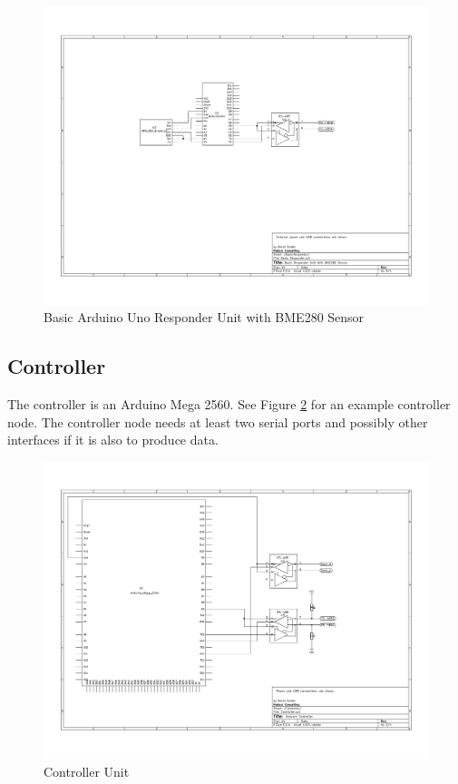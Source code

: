 \documentclass[10pt]{article}
\begin{document}
\begin{figure}
  \centering
  \includegraphics[width=\textwidth]{ResponderUnit.pdf}
  \caption{Basic Arduino Uno Responder Unit with BME280 Sensor}
  \label{fig:basic}
\end{figure}

\subsection{Controller}
The controller is an Arduino Mega 2560.  See Figure \ref{fig:controller} for an example controller node.  The controller node needs at least two serial ports and possibly other interfaces if it is also to produce data.

\begin{figure}
  \centering
  \includegraphics[width=\textwidth]{ControllerUnit.pdf}
  \caption{Controller Unit}
  \label{fig:controller}
\end{figure}
\end{document}
